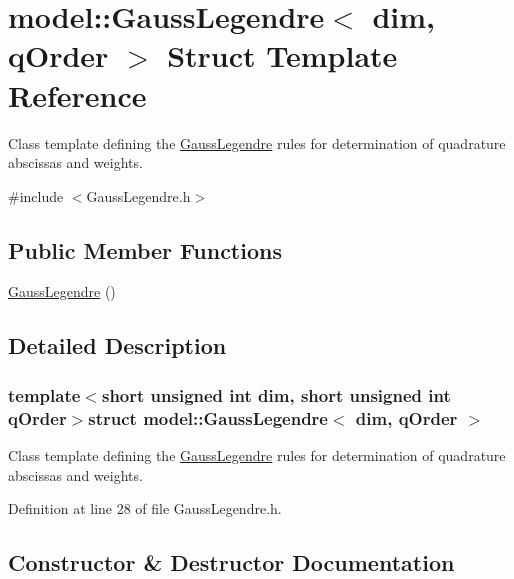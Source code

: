 \hypertarget{structmodel_1_1_gauss_legendre}{}\section{model\+:\+:Gauss\+Legendre$<$ dim, q\+Order $>$ Struct Template Reference}
\label{structmodel_1_1_gauss_legendre}


Class template defining the \hyperlink{structmodel_1_1_gauss_legendre}{Gauss\+Legendre} rules for determination of quadrature abscissas and weights.  




{\ttfamily \#include $<$Gauss\+Legendre.\+h$>$}

\subsection*{Public Member Functions}
\begin{DoxyCompactItemize}
\item 
\hyperlink{structmodel_1_1_gauss_legendre_a196630e190a54ea8a4746d30058e76fe}{Gauss\+Legendre} ()
\end{DoxyCompactItemize}


\subsection{Detailed Description}
\subsubsection*{template$<$short unsigned int dim, short unsigned int q\+Order$>$struct model\+::\+Gauss\+Legendre$<$ dim, q\+Order $>$}

Class template defining the \hyperlink{structmodel_1_1_gauss_legendre}{Gauss\+Legendre} rules for determination of quadrature abscissas and weights. 

Definition at line 28 of file Gauss\+Legendre.\+h.



\subsection{Constructor \& Destructor Documentation}
\hypertarget{structmodel_1_1_gauss_legendre_a196630e190a54ea8a4746d30058e76fe}{}
